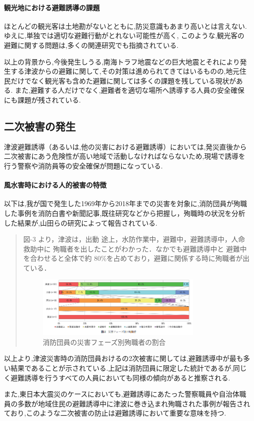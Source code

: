 \paragraph{観光地における避難誘導の課題}
ほとんどの観光客は土地勘がないとともに,防災意識もあまり高いとは言えない\cite{visitor01}.
ゆえに,単独では適切な避難行動がとれない可能性が高く,%
このような,観光客の避難に関する問題は,多くの関連研究でも指摘されている.

\vspace{\baselineskip}
以上の背景から,今後発生しうる,南海トラフ地震などの巨大地震とそれにより発生する津波からの避難に関して,その対策は進められてきてはいるものの,地元住民だけでなく観光客も含めた避難に関しては多くの課題を残している現状がある.
また,避難する人だけでなく,避難者を適切な場所へ誘導する人員の安全確保にも課題が残されている.


\subsection{二次被害の発生}
津波避難誘導（あるいは,他の災害における避難誘導）においては,発災直後から二次被害にあう危険性が高い地域で活動しなければならないため,現場で誘導を行う警察や消防員等の安全確保が問題になっている.\par
\paragraph{風水害時における人的被害の特徴}
以下は,我が国で発生した1969年から2018年までの災害を対象に,消防団員が殉職した事例を消防白書や新聞記事,既往研究などから把握し，殉職時の状況を分析した結果が,山田らの研究\cite{yamada2020}によって報告されている.
\begin{quote}
  図-3 より，津波は，出動 途上，水防作業中，避難中，避難誘導中，人命救助中に 殉職者を出したことがわかった．なかでも避難誘導中と 避難中を合わせると全体で約 80\%を占めており，避難に関係する時に殉職者が出ている．
  \begin{figure}[H] 
    \centering 
    \includegraphics[width=0.8\textwidth]{Figures/fig-01.png}
    \caption{消防団員の災害フェーズ別殉職者の割合} 
    \label{fig:01} 
  \end{figure}
\end{quote}
以上より,津波災害時の消防団員おけるの2次被害に関しては,避難誘導中が最も多い結果であることが示されている.上記は消防団員に限定した統計であるが,同じく避難誘導を行うすべての人員においても同様の傾向があると推察される.\par
また,東日本大震災のケースにおいても,避難誘導にあたった警察職員や自治体職員の多数が地域住民の避難誘導中に津波に巻き込まれ殉職された事例\cite{touhoku-01}が報告されており,このような二次被害の防止は避難誘導において重要な意味を持つ.

